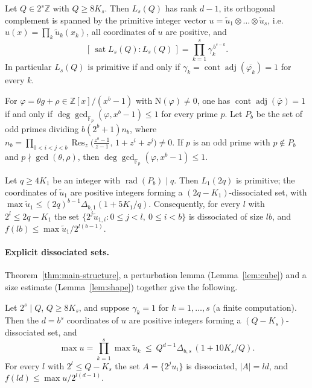\documentclass[12pt]{article}
\newcommand{\Z}{\mathbb{Z}}
\newcommand{\F}{\mathbb{F}}
\newcommand{\cont}{\operatorname{cont}}
\newcommand{\adj}{\operatorname{adj}}
\newcommand{\Res}{\operatorname{Res}}
\newcommand{\rad}{\operatorname{rad}}
\newcommand{\sat}{\operatorname{sat}}
\newcommand{\Nm}{\mathrm{N}}
\newcommand{\gpoly}{g}
\begin{document}
\begin{theorem}\label{thm:main-structure}
Let $Q\in2^s\Z$ with $Q\ge8K_s$. Then $L_s(Q)$ has rank $d-1$, its orthogonal complement is spanned by the primitive integer vector
$u=\tilde u_1\otimes\dots\otimes\tilde u_s$, i.e.\ $u(x)=\prod_k\tilde u_k(x_k)$, all coordinates of $u$ are positive, and
\[
 [\,\sat L_s(Q):L_s(Q)\,]=\prod_{k=1}^{s}\gamma_k^{\,b^{s-k}} .
\]
In particular $L_s(Q)$ is primitive if and only if $\gamma_k=\cont\adj(\overline{\varphi_k})=1$ for every $k$.
\end{theorem}

\begin{theorem}\label{thm:levels-intro}
For $\varphi=\theta\gpoly+\rho\in\Z[x]/(x^b-1)$ with $\Nm(\varphi)\ne0$, one has $\cont\adj(\bar\varphi)=1$ if and only if
$\deg\gcd_{\F_p}(\varphi,x^b-1)\le1$ for every prime $p$. Let $P_b$ be the set of odd primes dividing $b(2^b+1)n_b$,
where $n_b=\prod_{0<i<j<b}\Res_z\bigl(\tfrac{z^b-1}{z-1},\,1+z^i+z^j\bigr)\neq0$. If $p$ is an odd prime with $p\notin P_b$
and $p\nmid\gcd(\theta,\rho)$, then $\deg\gcd_{\F_p}(\varphi,x^b-1)\le1$.
\end{theorem}

\begin{theorem}\label{thm:A-intro}
Let $q\ge4K_1$ be an integer with $\rad(P_b)\mid q$. Then $L_1(2q)$ is primitive; the coordinates of $\tilde u_1$ are
positive integers forming a $(2q-K_1)$-dissociated set, with $\max\tilde u_1\le(2q)^{b-1}\Delta_{b,1}(1+5K_1/q)$.
Consequently, for every $l$ with $2^l\le2q-K_1$ the set $\{2^j\tilde u_{1,i}:0\le j<l,\ 0\le i<b\}$ is dissociated of size
$lb$, and $f(lb)\le\max\tilde u_1/2^{l(b-1)}$.
\end{theorem}

\paragraph{Explicit dissociated sets.} Theorem~\ref{thm:main-structure}, a perturbation lemma (Lemma~\ref{lem:cube})
and a size estimate (Lemma~\ref{lem:shape}) together give the following.

\begin{theorem}\label{thm:explicit-intro}
Let $2^s\mid Q$, $Q\ge8K_s$, and suppose $\gamma_k=1$ for $k=1,\dots,s$ (a finite computation).
Then the $d=b^s$ coordinates of $u$ are positive integers forming a $(Q-K_s)$-dissociated set, and
\[
\max u=\prod_{k=1}^s\max\tilde u_k\ \le\ Q^{d-1}\Delta_{b,s}\,(1+10K_s/Q).
\]
For every $l$ with $2^l\le Q-K_s$ the set $A=\{2^ju_i\}$ is dissociated, $|A|=ld$, and $f(ld)\le\max u/2^{l(d-1)}$.
\end{theorem}
\end{document}

